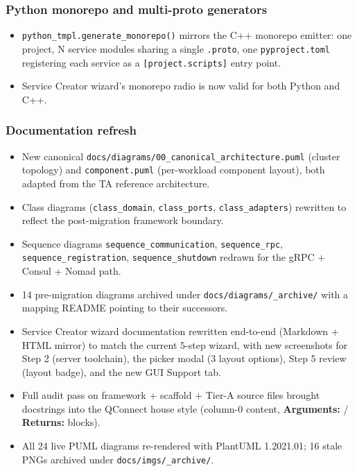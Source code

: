 \subsubsection{Python monorepo and multi-proto generators}

\begin{itemize}
   \item \texttt{python\_tmpl.generate\_monorepo()} mirrors the C++ monorepo
         emitter: one project, N service modules sharing a single \texttt{.proto},
         one \texttt{pyproject.toml} registering each service as a
         \texttt{[project.scripts]} entry point.
   \item Service Creator wizard's monorepo radio is now valid for both
         Python and C++.
\end{itemize}

\subsubsection{Documentation refresh}

\begin{itemize}
   \item New canonical
         \texttt{docs/diagrams/00\_canonical\_architecture.puml} (cluster
         topology) and \texttt{component.puml} (per-workload component layout),
         both adapted from the TA reference architecture.
   \item Class diagrams (\texttt{class\_domain}, \texttt{class\_ports},
         \texttt{class\_adapters}) rewritten to reflect the post-migration
         framework boundary.
   \item Sequence diagrams \texttt{sequence\_communication},
         \texttt{sequence\_rpc}, \texttt{sequence\_registration},
         \texttt{sequence\_shutdown} redrawn for the gRPC + Consul + Nomad path.
   \item 14 pre-migration diagrams archived under
         \texttt{docs/diagrams/\_archive/} with a mapping README pointing to
         their successors.
   \item Service Creator wizard documentation rewritten end-to-end (Markdown
         + HTML mirror) to match the current 5-step wizard, with new
         screenshots for Step 2 (server toolchain), the picker modal (3 layout
         options), Step 5 review (layout badge), and the new GUI Support tab.
   \item Full audit pass on framework + scaffold + Tier-A source files
         brought docstrings into the QConnect house style (column-0 content,
         \textbf{Arguments:} / \textbf{Returns:} blocks).
   \item All 24 live PUML diagrams re-rendered with PlantUML 1.2021.01;
         16 stale PNGs archived under \texttt{docs/imgs/\_archive/}.
\end{itemize}

